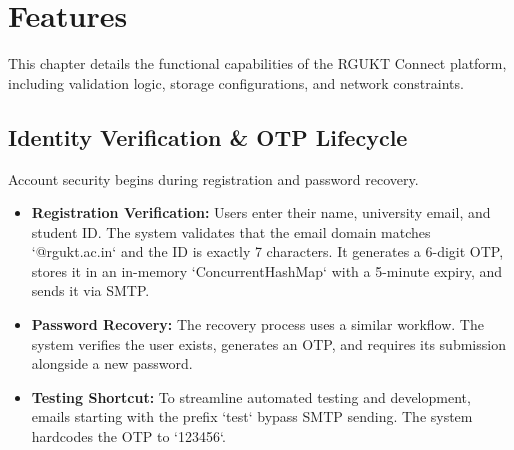 \chapter{Features}
\label{ch:features}

This chapter details the functional capabilities of the RGUKT Connect platform, including validation logic, storage configurations, and network constraints.

\section{Identity Verification \& OTP Lifecycle}
Account security begins during registration and password recovery.
\begin{itemize}
    \item \textbf{Registration Verification:} Users enter their name, university email, and student ID. The system validates that the email domain matches `@rgukt.ac.in` and the ID is exactly 7 characters. It generates a 6-digit OTP, stores it in an in-memory `ConcurrentHashMap` with a 5-minute expiry, and sends it via SMTP.
    \item \textbf{Password Recovery:} The recovery process uses a similar workflow. The system verifies the user exists, generates an OTP, and requires its submission alongside a new password.
    \item \textbf{Testing Shortcut:} To streamline automated testing and development, emails starting with the prefix `test` bypass SMTP sending. The system hardcodes the OTP to `123456`.
\end{itemize}

